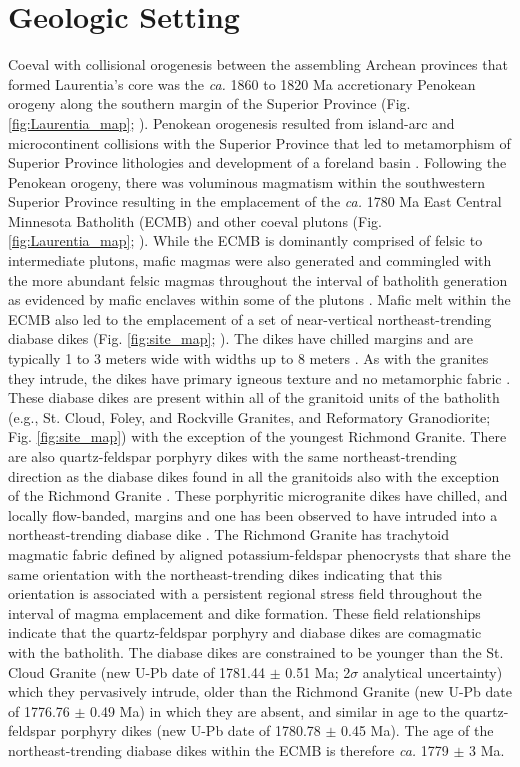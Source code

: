 \documentclass[draft]{agujournal2019}
\begin{document}
\section{Geologic Setting}

Coeval with collisional orogenesis between the assembling Archean provinces that formed Laurentia's core was the \textit{ca.} 1860 to 1820 Ma accretionary Penokean orogeny along the southern margin of the Superior Province (Fig. \ref{fig:Laurentia_map}; ). Penokean orogenesis resulted from island-arc and microcontinent collisions with the Superior Province that led to metamorphism of Superior Province lithologies and development of a foreland basin \cite{Schulz2007a, Holm2019a}. Following the Penokean orogeny, there was voluminous magmatism within the southwestern Superior Province resulting in the emplacement of the \textit{ca.} 1780 Ma East Central Minnesota Batholith (ECMB) and other coeval plutons (Fig. \ref{fig:Laurentia_map}; ). While the ECMB is dominantly comprised of felsic to intermediate plutons, mafic magmas were also generated and commingled with the more abundant felsic magmas throughout the interval of batholith generation as evidenced by mafic enclaves within some of the plutons \cite{Boerboom2005b, Boerboom2011b, Schmitz2018a}. Mafic melt within the ECMB also led to the emplacement of a set of near-vertical northeast-trending diabase dikes (Fig. \ref{fig:site_map}; ).  The dikes have chilled margins and are typically 1 to 3 meters wide with widths up to 8 meters \cite{Boerboom2005b}. As with the granites they intrude, the dikes have primary igneous texture and no metamorphic fabric \cite{Boerboom2005b}. These diabase dikes are present within all of the granitoid units of the batholith (e.g., St. Cloud, Foley, and Rockville Granites, and Reformatory Granodiorite; Fig. \ref{fig:site_map}) with the exception of the youngest Richmond Granite. There are also quartz-feldspar porphyry dikes with the same northeast-trending direction as the diabase dikes found in all the granitoids also with the exception of the Richmond Granite \cite{Boerboom2005b}. These porphyritic microgranite dikes have chilled, and locally flow-banded, margins and one has been observed to have intruded into a northeast-trending diabase dike \cite{Boerboom2000a}. The Richmond Granite has trachytoid magmatic fabric defined by aligned potassium-feldspar phenocrysts that share the same orientation with the northeast-trending dikes \cite{Boerboom2000a} indicating that this orientation is associated with a persistent regional stress field throughout the interval of magma emplacement and dike formation. These field relationships indicate that the quartz-feldspar porphyry and diabase dikes are comagmatic with the batholith. The diabase dikes are constrained to be younger than the St. Cloud Granite (new U-Pb date of 1781.44 $\pm$ 0.51 Ma; 2$\sigma$ analytical uncertainty) which they pervasively intrude, older than the Richmond Granite (new U-Pb date of 1776.76 $\pm$ 0.49 Ma) in which they are absent, and similar in age to the quartz-feldspar porphyry dikes (new U-Pb date of 1780.78 $\pm$ 0.45 Ma). The age of the northeast-trending diabase dikes within the ECMB is therefore \textit{ca.} 1779 $\pm$ 3 Ma.
\end{document}
